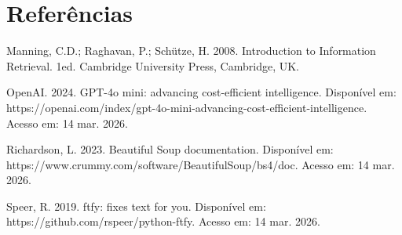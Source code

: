\documentclass[11pt,a4paper]{article}
\begin{document}
\section*{Refer\^{e}ncias}

\begin{singlespace}

Manning, C.D.; Raghavan, P.; Sch\"{u}tze, H. 2008. Introduction to Information Retrieval. 1ed. Cambridge University Press, Cambridge, UK.

OpenAI. 2024. GPT-4o mini: advancing cost-efficient intelligence. Dispon\'{i}vel em: https://openai.com/index/gpt-4o-mini-advancing-cost-efficient-intelligence. Acesso em: 14 mar. 2026.

Richardson, L. 2023. Beautiful Soup documentation. Dispon\'{i}vel em: https://www.crummy.com/software/BeautifulSoup/bs4/doc. Acesso em: 14 mar. 2026.

Speer, R. 2019. ftfy: fixes text for you. Dispon\'{i}vel em: https://github.com/rspeer/python-ftfy. Acesso em: 14 mar. 2026.

\end{singlespace}
\end{document}
